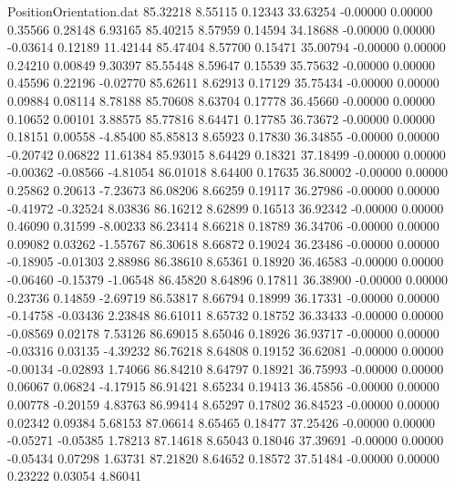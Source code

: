 \begin{filecontents}{PositionOrientation.dat}
  85.32218    8.55115    0.12343    33.63254   -0.00000    0.00000    0.35566    0.28148    6.93165
  85.40215    8.57959    0.14594    34.18688   -0.00000    0.00000   -0.03614    0.12189   11.42144
  85.47404    8.57700    0.15471    35.00794   -0.00000    0.00000    0.24210    0.00849    9.30397
  85.55448    8.59647    0.15539    35.75632   -0.00000    0.00000    0.45596    0.22196   -0.02770
  85.62611    8.62913    0.17129    35.75434   -0.00000    0.00000    0.09884    0.08114    8.78188
  85.70608    8.63704    0.17778    36.45660   -0.00000    0.00000    0.10652    0.00101    3.88575
  85.77816    8.64471    0.17785    36.73672   -0.00000    0.00000    0.18151    0.00558   -4.85400
  85.85813    8.65923    0.17830    36.34855   -0.00000    0.00000   -0.20742    0.06822   11.61384
  85.93015    8.64429    0.18321    37.18499   -0.00000    0.00000   -0.00362   -0.08566   -4.81054
  86.01018    8.64400    0.17635    36.80002   -0.00000    0.00000    0.25862    0.20613   -7.23673
  86.08206    8.66259    0.19117    36.27986   -0.00000    0.00000   -0.41972   -0.32524    8.03836
  86.16212    8.62899    0.16513    36.92342   -0.00000    0.00000    0.46090    0.31599   -8.00233
  86.23414    8.66218    0.18789    36.34706   -0.00000    0.00000    0.09082    0.03262   -1.55767
  86.30618    8.66872    0.19024    36.23486   -0.00000    0.00000   -0.18905   -0.01303    2.88986
  86.38610    8.65361    0.18920    36.46583   -0.00000    0.00000   -0.06460   -0.15379   -1.06548
  86.45820    8.64896    0.17811    36.38900   -0.00000    0.00000    0.23736    0.14859   -2.69719
  86.53817    8.66794    0.18999    36.17331   -0.00000    0.00000   -0.14758   -0.03436    2.23848
  86.61011    8.65732    0.18752    36.33433   -0.00000    0.00000   -0.08569    0.02178    7.53126
  86.69015    8.65046    0.18926    36.93717   -0.00000    0.00000   -0.03316    0.03135   -4.39232
  86.76218    8.64808    0.19152    36.62081   -0.00000    0.00000   -0.00134   -0.02893    1.74066
  86.84210    8.64797    0.18921    36.75993   -0.00000    0.00000    0.06067    0.06824   -4.17915
  86.91421    8.65234    0.19413    36.45856   -0.00000    0.00000    0.00778   -0.20159    4.83763
  86.99414    8.65297    0.17802    36.84523   -0.00000    0.00000    0.02342    0.09384    5.68153
  87.06614    8.65465    0.18477    37.25426   -0.00000    0.00000   -0.05271   -0.05385    1.78213
  87.14618    8.65043    0.18046    37.39691   -0.00000    0.00000   -0.05434    0.07298    1.63731
  87.21820    8.64652    0.18572    37.51484   -0.00000    0.00000    0.23222    0.03054    4.86041

\end{filecontents}
